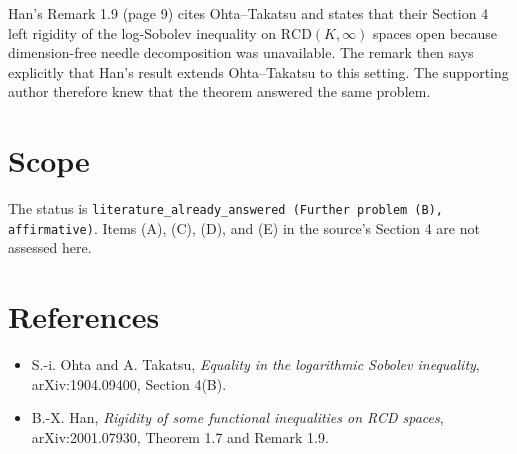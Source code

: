 \documentclass[11pt]{article}
\begin{document}
Han's Remark 1.9 (page 9) cites Ohta--Takatsu and states that their Section 4
left rigidity of the log-Sobolev inequality on
$\mathrm{RCD}(K,\infty)$ spaces open because dimension-free needle
decomposition was unavailable.  The remark then says explicitly that Han's
result extends Ohta--Takatsu to this setting.  The supporting author therefore
knew that the theorem answered the same problem.

\section*{Scope}

The status is \texttt{literature\_already\_answered (Further problem (B),
affirmative)}.  Items (A), (C), (D), and (E) in the source's Section 4 are not
assessed here.

\section*{References}

\begin{itemize}[leftmargin=*]
\item S.-i. Ohta and A. Takatsu, \emph{Equality in the logarithmic Sobolev
inequality}, arXiv:1904.09400, Section 4(B).
\item B.-X. Han, \emph{Rigidity of some functional inequalities on RCD
spaces}, arXiv:2001.07930, Theorem 1.7 and Remark 1.9.
\end{itemize}
\end{document}
